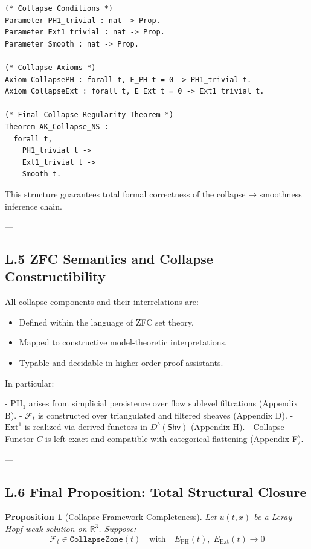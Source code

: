 \documentclass[11pt]{article}
\newtheorem{proposition}[theorem]{Proposition}
\begin{document}
{{{\begin{lstlisting}[language=Coq]
(* Collapse Conditions *)
Parameter PH1_trivial : nat -> Prop.
Parameter Ext1_trivial : nat -> Prop.
Parameter Smooth : nat -> Prop.

(* Collapse Axioms *)
Axiom CollapsePH : forall t, E_PH t = 0 -> PH1_trivial t.
Axiom CollapseExt : forall t, E_Ext t = 0 -> Ext1_trivial t.

(* Final Collapse Regularity Theorem *)
Theorem AK_Collapse_NS :
  forall t,
    PH1_trivial t ->
    Ext1_trivial t ->
    Smooth t.
\end{lstlisting}

This structure guarantees total formal correctness of the collapse → smoothness inference chain.

---

\subsection*{L.5 ZFC Semantics and Collapse Constructibility}

All collapse components and their interrelations are:

\begin{itemize}
  \item Defined within the language of ZFC set theory.
  \item Mapped to constructive model-theoretic interpretations.
  \item Typable and decidable in higher-order proof assistants.
\end{itemize}

In particular:

- \( \mathrm{PH}_1 \) arises from simplicial persistence over flow sublevel filtrations (Appendix B).
- \( \mathcal{F}_t \) is constructed over triangulated and filtered sheaves (Appendix D).
- \( \mathrm{Ext}^1 \) is realized via derived functors in \( D^b(\mathsf{Shv}) \) (Appendix H).
- Collapse Functor \( C \) is left-exact and compatible with categorical flattening (Appendix F).

---

\subsection*{L.6 Final Proposition: Total Structural Closure}

\begin{proposition}[Collapse Framework Completeness]
Let \( u(t,x) \) be a Leray–Hopf weak solution on \( \mathbb{R}^3 \).  
Suppose:
\[
\mathcal{F}_t \in \texttt{CollapseZone}(t)
\quad \text{with} \quad
E_{\mathrm{PH}}(t),\; E_{\mathrm{Ext}}(t) \to 0
\]


\end{proposition}}}}
\end{document}

